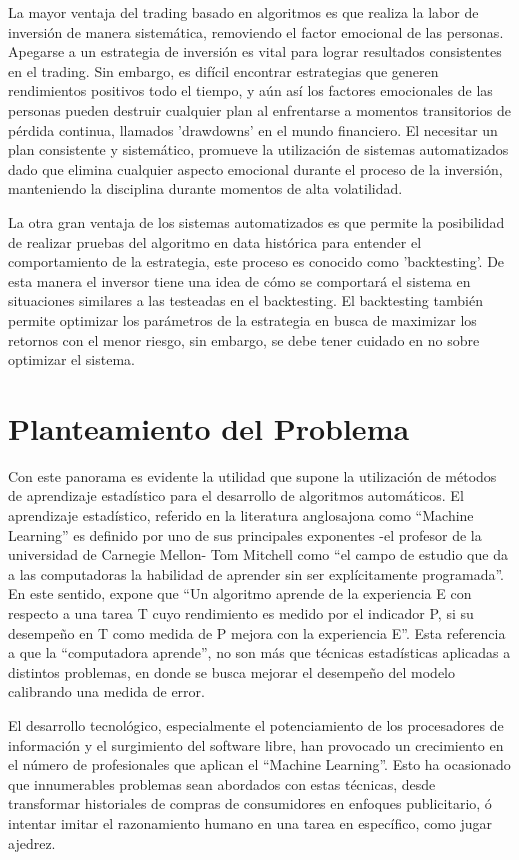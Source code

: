 \documentclass[a4paper,12pt]{Latex/Classes/PhDthesisPSnPDF}
\begin{document}
La mayor ventaja del trading basado en algoritmos es que realiza la labor de inversión de manera sistemática, removiendo el factor emocional de las personas. Apegarse a un estrategia de inversión es vital para lograr resultados consistentes en el trading. Sin embargo, es difícil encontrar estrategias que generen rendimientos positivos todo el tiempo, y aún así los factores emocionales de las personas pueden destruir cualquier plan al enfrentarse a momentos transitorios de pérdida continua, llamados 'drawdowns' en el mundo financiero. El necesitar un plan consistente y sistemático, promueve la utilización de sistemas automatizados dado que elimina cualquier aspecto emocional durante el proceso de la inversión, manteniendo la disciplina durante momentos de alta volatilidad.

La otra gran ventaja de los sistemas automatizados es que permite la posibilidad de realizar pruebas del algoritmo en data histórica para entender el comportamiento de la estrategia, este proceso es conocido como 'backtesting'. De esta manera el inversor tiene una idea de cómo se comportará el sistema en situaciones similares a las testeadas en el backtesting. El backtesting también permite optimizar los parámetros de la estrategia en busca de maximizar los retornos con el menor riesgo, sin embargo, se debe tener cuidado en no sobre optimizar el sistema. 

\section{Planteamiento del Problema}

Con este panorama es evidente la utilidad que supone la utilización de métodos de aprendizaje estadístico para el desarrollo de algoritmos automáticos. El aprendizaje estadístico, referido en la literatura anglosajona como “Machine Learning” es definido por uno de sus principales exponentes -el profesor de la universidad de Carnegie Mellon- Tom Mitchell como “el campo de estudio que da a las computadoras la habilidad de aprender sin ser explícitamente programada”. En este sentido, expone que “Un algoritmo aprende de la experiencia E con respecto a una tarea T cuyo rendimiento es medido por el indicador P, si su desempeño en T como medida de P mejora con la experiencia E”. Esta referencia a que la “computadora aprende”, no son más que técnicas estadísticas aplicadas a distintos problemas, en donde se busca mejorar el desempeño del modelo calibrando una medida de error.

El desarrollo tecnológico, especialmente el potenciamiento de los procesadores de información y el surgimiento del software libre, han provocado un crecimiento en el número de profesionales que aplican el “Machine Learning”. Esto ha ocasionado que innumerables problemas sean abordados con estas técnicas, desde transformar historiales de compras de consumidores en enfoques publicitario, ó intentar imitar el razonamiento humano en una tarea en específico, como jugar ajedrez.
\end{document}
